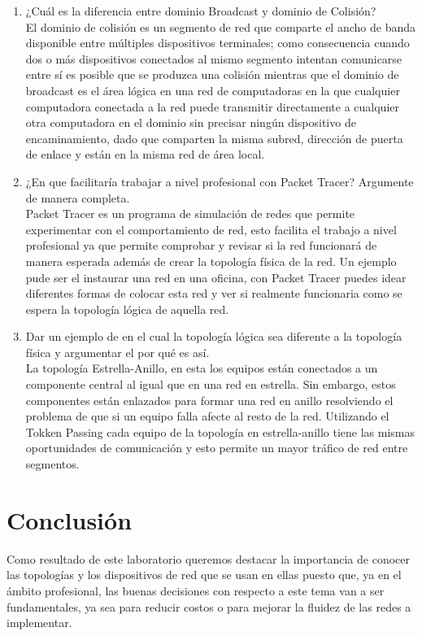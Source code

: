 \documentclass{article}
\begin{document}
\begin{enumerate}
    \item¿Cuál es la diferencia entre dominio Broadcast y dominio de Colisión?\\
    \newline El dominio de colisión es un segmento de red que comparte el ancho de banda disponible entre múltiples dispositivos terminales; como consecuencia cuando dos o más dispositivos conectados al mismo segmento intentan comunicarse entre sí es posible que se produzca una colisión mientras que el dominio de broadcast es el área lógica en una red de computadoras en la que cualquier computadora conectada a la red puede transmitir directamente a cualquier otra computadora en el dominio sin precisar ningún dispositivo de encaminamiento, dado que comparten la misma subred, dirección de puerta de enlace y están en la misma red de área local.
    \item¿En que facilitaría trabajar a nivel profesional con Packet Tracer? Argumente de manera completa.\\
    \newline Packet Tracer es un programa de simulación de redes que permite experimentar con el comportamiento de red, esto facilita el trabajo a nivel profesional ya que permite comprobar y revisar si la red funcionará de manera esperada además de crear la topología física de la red.
Un ejemplo pude ser el instaurar una red en una oficina, con Packet Tracer puedes idear diferentes formas de colocar esta red y ver si realmente funcionaria como se espera la topología lógica de aquella red.

    \item Dar un ejemplo de en el cual la topología lógica sea diferente a la topología física y argumentar el por qué es así.\\
    \newline La topología Estrella-Anillo, en esta los equipos están conectados a un componente central al igual que en una red en estrella. Sin embargo, estos componentes están enlazados para formar una red en anillo resolviendo el problema de que si un equipo falla afecte al resto de la red. Utilizando el Tokken Passing cada equipo de la topología en estrella-anillo tiene las mismas oportunidades de comunicación y esto permite un mayor tráfico de red entre segmentos.

\end{enumerate}


\newpage
\section{Conclusión \vspace{0.5cm}}
Como resultado de este laboratorio queremos destacar la importancia de conocer las topologías y los dispositivos de red que se usan en ellas puesto que, ya en el ámbito profesional, las buenas decisiones con respecto a este tema van a ser fundamentales, ya sea para reducir costos o para mejorar la fluidez de las redes a implementar.
\end{document}

